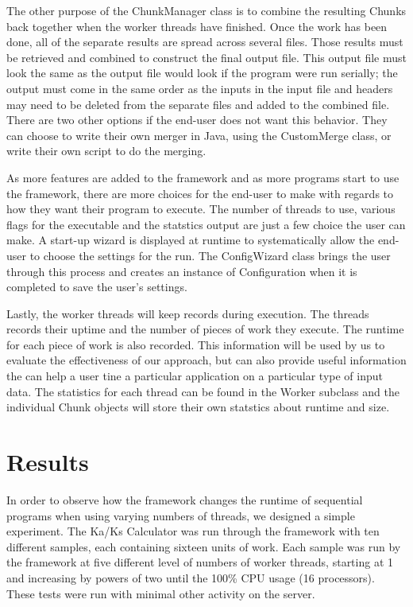 \documentclass[12pt]{article}
\begin{document}
The other purpose of the ChunkManager class is to combine the resulting Chunks 
back together when the worker threads have finished. Once the work has been
done, all of the separate results are spread across several files. Those results 
must be retrieved and combined to construct the final output file. This output 
file must look the same as the output file would look if the program were run 
serially; the output must come in the same order as the inputs in the input file
and headers may need to be deleted from the separate files and added to the 
combined file. There are two other options if the end-user does not want this 
behavior. They can choose to write their own merger in Java, using the 
CustomMerge class, or write their own script to do the merging. 

As more features are added to the framework and as more programs start to use 
the framework, there are more choices for the end-user to make with regards to 
how they want their program to execute. The number of threads to use, various 
flags for the executable and the statstics output are just a few choice the 
user can make. A start-up wizard is displayed at runtime to systematically allow
the end-user to choose the settings for the run. The ConfigWizard class brings 
the user through this process and creates an instance of Configuration when it 
is completed to save the user's settings.

Lastly, the worker threads will keep records during execution. The threads 
records their uptime and the number of pieces of work they execute. The runtime 
for each piece of work is also recorded. This information will be used by us to
evaluate the effectiveness of our approach, but can also provide useful
information the can help a user tine a particular application on a particular
type of input data. The statistics for each thread can be found in the Worker 
subclass and the individual Chunk objects will store their own statstics about 
runtime and size.

\section{Results}

In order to observe how the framework changes the runtime of sequential programs 
when using varying numbers of threads, we designed a simple experiment. The 
Ka/Ks Calculator was run through the framework with ten different samples, each 
containing sixteen units of work. Each sample was run by the framework at five 
different level of numbers of worker threads, starting at 1 and increasing by 
powers of two until the 100\% CPU usage (16 processors). These tests were run
with minimal other activity on the server.
\end{document}

